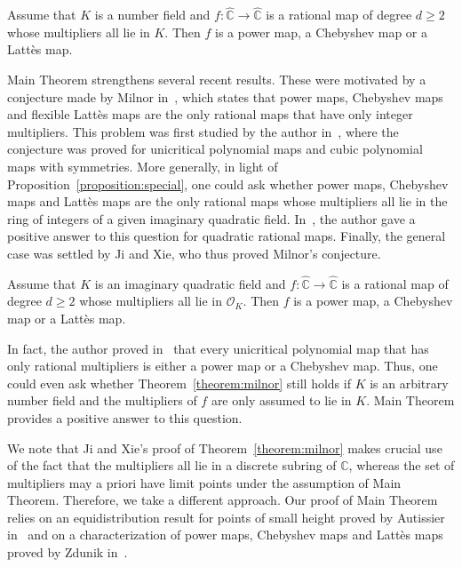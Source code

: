\begin{maintheorem}
Assume that $K$ is a number field and $f \colon \widehat{\mathbb{C}} \to \widehat{\mathbb{C}}$ is a rational map of degree $d \geq 2$ whose multipliers all lie in $K$. Then $f$ is a power map, a Chebyshev map or a Lattès map.
\end{maintheorem}

Main Theorem strengthens several recent results. These were motivated by a conjecture made by Milnor in~\cite{M2006}, which states that power maps, Chebyshev maps and flexible Lattès maps are the only rational maps that have only integer multipliers. This problem was first studied by the author in~\cite{H2021}, where the conjecture was proved for unicritical polynomial maps and cubic polynomial maps with symmetries. More generally, in light of Proposition~\ref{proposition:special}, one could ask whether power maps, Chebyshev maps and Lattès maps are the only rational maps whose multipliers all lie in the ring of integers of a given imaginary quadratic field. In~\cite{H2022}, the author gave a positive answer to this question for quadratic rational maps. Finally, the general case was settled by Ji and Xie, who thus proved Milnor's conjecture.

\begin{theorem}[{\cite[Th.\,1.13]{JX2022}}]
\label{theorem:milnor}
Assume that $K$ is an imaginary quadratic field and $f \colon \widehat{\mathbb{C}} \to \widehat{\mathbb{C}}$ is a rational map of degree $d \geq 2$ whose multipliers all lie in $\mathcal{O}_{K}$. Then $f$ is a power map, a Chebyshev map or a Lattès map.
\end{theorem}

In fact, the author proved in~\cite{H2021} that every unicritical polynomial map that has only rational multipliers is either a power map or a Chebyshev map. Thus, one could even ask whether Theorem~\ref{theorem:milnor} still holds if $K$ is an arbitrary number field and the multipliers of $f$ are only assumed to lie in $K$. Main Theorem provides a positive answer to this question.

We note that Ji and Xie's proof of Theorem~\ref{theorem:milnor} makes crucial use of the fact that the multipliers all lie in a discrete subring of $\mathbb{C}$, whereas the set of multipliers may a priori have limit points under the assumption of Main Theorem. Therefore, we take a different approach. Our proof of Main Theorem relies on an equidistribution result for points of small height proved by Autissier in~\cite{A2001} and on a characterization of power maps, Chebyshev maps and Lattès maps proved by Zdunik in~\cite{Z2014}.

